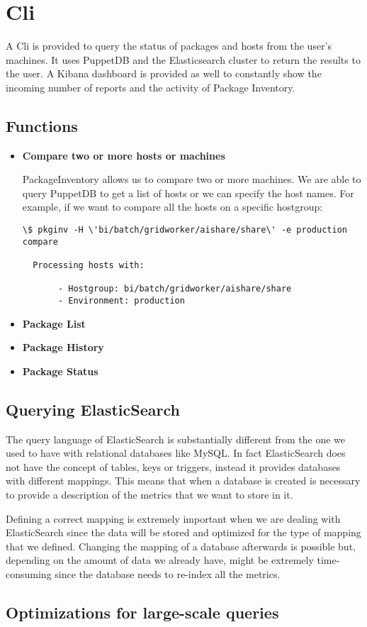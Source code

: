 \section{Cli}

A Cli is provided to query the status of packages and hosts from the
user's machines. It uses PuppetDB and the Elasticsearch cluster to return
the results to the user. A Kibana dashboard is provided as well to
constantly show the incoming number of reports and the activity of Package
Inventory.

\subsection{Functions}

\begin{itemize}
  \item \textbf{Compare two or more hosts or machines}

  PackageInventory allows us to compare two or more machines. We are able to 
  query PuppetDB to get a list of hosts or we can specify the host names. For 
  example, if we want to compare all the hosts on a specific hostgroup:
  
  \begin{lstlisting}[frame=single]
  \$ pkginv -H \'bi/batch/gridworker/aishare/share\' -e production compare
  
  Processing hosts with:
  
       - Hostgroup: bi/batch/gridworker/aishare/share
       - Environment: production
  \end{lstlisting}

  \item \textbf{Package List}
  \item \textbf{Package History}
  \item \textbf{Package Status}
\end{itemize}

\subsection{Querying ElasticSearch}

The query language of ElasticSearch is substantially different from the
one we used to have with relational databases like MySQL\@. In fact
ElasticSearch does not have the concept of tables, keys or triggers,
instead it provides databases with different mappings. This means that
when a database is created is necessary to provide a description of the
metrics that we want to store in it.

Defining a correct mapping is extremely important when we are dealing with
ElasticSearch since the data will be stored and optimized for the type of
mapping that we defined. Changing the mapping of a database afterwards is
possible but, depending on the amount of data we already have, might be
extremely time-consuming since the database needs to re-index all the
metrics.



\subsection{Optimizations for large-scale queries}
